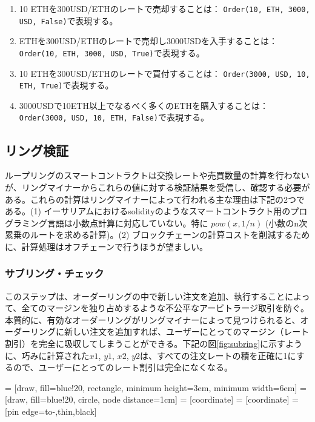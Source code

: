 \documentclass{article}
\makeatletter
\newenvironment{figurehere}
 {\def\@captype{figure}}
 {}
\makeatother
\begin{document}
\begin{multicols}{2}
\begin{enumerate}
	\item 10 ETHを300USD/ETHのレートで売却することは： \verb|Order(10, ETH, 3000, USD, False)|で表現する。
	\item ETHを300USD/ETHのレートで売却し3000USDを入手することは： \verb|Order(10, ETH, 3000, USD, True)|で表現する。
	\item 10 ETHを300USD/ETHのレートで買付することは： \verb|Order(3000, USD, 10, ETH, True)|で表現する。
	\item 3000USDで10ETH以上でなるべく多くのETHを購入することは： \verb|Order(3000, USD, 10, ETH, False)|で表現する。
\end{enumerate}



\subsection{リング検証\label{sec:ring_verification}}
ループリングのスマートコントラクトは交換レートや売買数量の計算を行わないが、リングマイナーからこれらの値に対する検証結果を受信し、確認する必要がある。これらの計算はリングマイナーによって行われる主な理由は下記の2つである。(1) イーサリアムにおけるsolidity\cite{dannen2017introducing}のようなスマートコントラクト用のプログラミング言語は小数点計算に対応していない。特に $pow(x, 1/n)$ (小数のn次累乗のルートを求める計算)。(2) ブロックチェーンの計算コストを削減するために、計算処理はオフチェーンで行うほうが望ましい。

\subsubsection{サブリング・チェック\label{sec:sub_ring_check}}
このステップは、オーダーリングの中で新しい注文を追加、執行することによって、全てのマージンを独り占めするような不公平なアービトラージ取引を防ぐ。本質的に、有効なオーダーリングがリングマイナーによって見つけられると、オーダーリングに新しい注文を追加すれば、ユーザーにとってのマージン（レート割引）を完全に吸収してしまうことができる。下記の図\ref{fig:subring}に示すように、巧みに計算された$x1$, $y1$, $x2$, $y2$は、すべての注文レートの積を正確に1にするので、ユーザーにとってのレート割引は完全になくなる。

\begin{center}
\begin{figurehere}
\centering
{} = [draw, fill=blue!20, rectangle, 
    minimum height=3em, minimum width=6em]
 = [draw, fill=blue!20, circle, node distance=1cm]
 = [coordinate]
 = [coordinate]
 = [pin edge={to-,thin,black}]


\end{figurehere}
\end{center}
\end{multicols}
\end{document}
